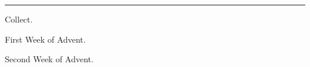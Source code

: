 {  
  \vspace{-\baselineskip}
  \subtitle{\small{Thursday.}}
  {
  \def\noeuouae{T}
  }
  \medskip
  \hrule
  \medskip
  {
      \newcommand{\commvlatin}{Roráte cæli désuper, et nubes pluant \textbf{ju}stum.}
      \newcommand{\commrlatin}{Aperiátur terra, et gérminet Salva\textbf{tó}rem.}
      \newcommand{\commvtranslation}{Ye heavens, drop down dew from above, and let the clouds rain down the Just One.}
      \newcommand{\commrtranslation}{Let the earth open and bud forth the Saviour.}
  \printvrcommem{}
  }

  \begin{center}{\large Collect.}\end{center}
  \vspace{-\baselineskip}
  \def\printcollectheading{F}
  {
  \begin{center}{First Week of Advent.}\end{center}
  \def\gabcfolder{../Advent1}
  
  \printcollect{\collect}{\collecttranslation}
  }
  {
  \medskip
  \begin{center}{Second Week of Advent.}\end{center}
  \def\gabcfolder{../Advent2}
  
  \printcollect{\latincomcollect}{\englishcomcollect}
  }

  \bigskip
  \benedicamusdomino{}
}
